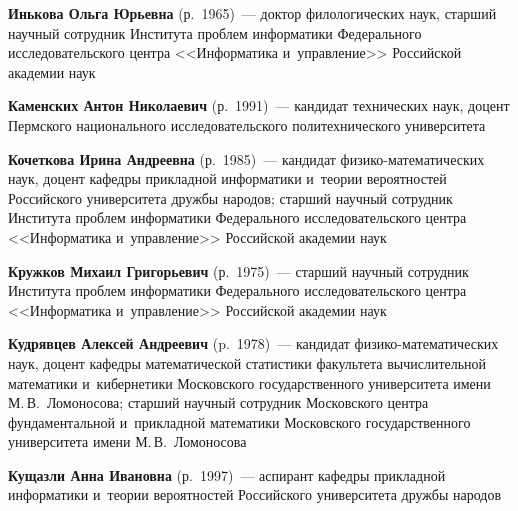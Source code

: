 \begin{multicols}{2}
\vspace*{2pt}

\noindent
\textbf{Инькова Ольга Юрьевна} (р.\ 1965)~--- 
доктор филологических наук, старший научный сотрудник Института проб\-лем 
информатики Федерального исследовательского цент\-ра <<Информатика и~управ\-ле\-ние>> Российской академии наук

\vspace*{2pt}
 
 \noindent
\textbf{Каменских Антон Николаевич} (р.\ 1991)~--- 
кандидат технических наук, доцент Перм\-ско\-го национального исследовательского политехнического университета


\vspace*{2pt}

\noindent
\textbf{Кочеткова Ирина Андреевна} (р.\ 1985)~--- 
кандидат фи\-зи\-ко-ма\-те\-ма\-ти\-че\-ских наук, доцент ка\-фед\-ры при\-клад\-ной 
информатики и~тео\-рии вероятностей Российского университета друж\-бы \mbox{народов}; 
старший научный со\-труд\-ник Института проб\-лем информатики Федерального исследовательского цент\-ра 
<<Информатика и~управ\-ле\-ние>> Российской академии наук


\vspace*{2pt}

\noindent
\textbf{Кружков Михаил Григорьевич} (р.\ 1975)~--- 
старший научный сотрудник Института проб\-лем информатики Федерального исследовательского 
цент\-ра <<Информатика и~управ\-ле\-ние>> Российской академии наук 



\vspace*{2pt}

\noindent
\textbf{Кудрявцев Алексей Андреевич} (p.\ 1978)~--- 
кандидат фи\-зи\-ко-ма\-те\-ма\-ти\-че\-ских наук, доцент кафедры математической 
статистики факультета вы\-чис\-ли\-тель\-ной математики и~кибернетики Московского государственного 
университета имени М.\,В.~Ломоносова; старший научный со\-труд\-ник Московского цент\-ра 
фундаментальной и~при\-клад\-ной математики Московского государственного университета имени М.\,В.~Ломоносова

\vspace*{2pt}

\noindent
\textbf{Кущазли Анна Ивановна} (р.\ 1997)~--- 
аспирант ка\-фед\-ры при\-клад\-ной информатики и~тео\-рии 
вероятностей Российского университета друж\-бы народов


\vspace*{2pt}


\end{multicols}
